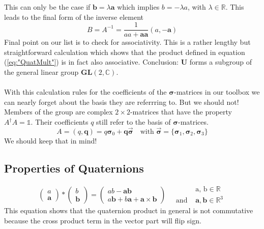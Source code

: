 \documentclass[11pt]{article}
\newcommand{\vvv}[1]{\ensuremath{\begin{pmatrix}#1\end{pmatrix}}}
\begin{document}
This can only be the case if $\mathbf{b} = \lambda\mathbf{a}$ which implies 
$b=-\lambda a$, with $\lambda \in \mathbb{R}$.
This leads to the final form of the inverse element
\begin{equation}
    B = A^{-1} = \frac{1}{aa+\mathbf{a}\mathbf{a}}(a, -\mathbf{a})
\end{equation}
Final point on our list is to check for associativity. This is a rather lengthy but
straightforward calculation which shows that the product defined in equation 
(\ref{eq:"QuatMult"}) is in fact also associative. Conclusion: $\mathbf{U}$ forms a subgroup
of the general linear group $\mathbf{GL}(2, \mathbb{C})$.\\
\\
With this calculation rules for the coefficients of the $\bm{\sigma}$-matrices in our toolbox
we can nearly forget about the basis they are referrring to. But we should not! Members of
the group are complex $2\times2$-matrices that have the property $A^\dagger A = \mathbb{1}$.
Their coefficients $q$ still refer to the basis of $\bm{\sigma}$-matrices.
\begin{equation}
    A=(q,\mathbf{q})=q\bm{\sigma}_0+\mathbf{q} \vec{\bm{\sigma}} \quad
    \text{with $\vec{\bm{\sigma}} = \{ \bm{\sigma}_1, \bm{\sigma}_2, \bm{\sigma}_3 \}$}
\end{equation}
We should keep that in mind!

\subsection{Properties of Quaternions}
%
\begin{equation}
    \vvv{a \\ \mathbf{a}} * \vvv{b \\ \mathbf{b}} = 
    \vvv{ab - \mathbf{a} \mathbf{b} \\ a\mathbf{b} + b\mathbf{a} + \mathbf{a} \times \mathbf{b}}
    \quad 
    \begin{aligned}
        &\text{a, b} \in \mathbb{R} \\ \text{and } &\mathbf{a}, \mathbf{b} \in \mathbb{R}^3
    \end{aligned}
\end{equation}
This equation shows that the quaternion product in general is not commutative because the 
cross product term in the vector part will flip sign.
\end{document}
